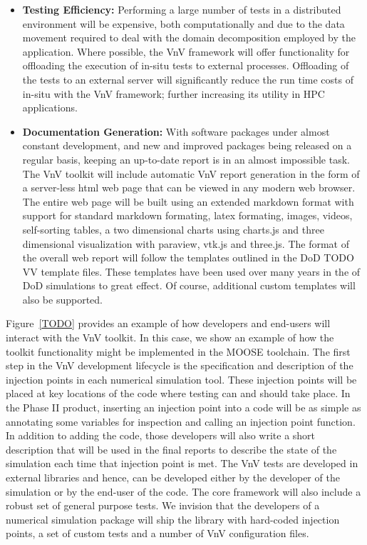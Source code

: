 \begin{itemize}
 \item{\bf \VV Testing Efficiency:}  Performing a large number of \VV tests in a distributed environment will be expensive, both computationally and due to the data movement required to deal with the domain decomposition employed by the application. Where possible, the VnV framework will offer functionality for offloading the execution of in-situ tests to external processes. Offloading of the tests to an external server will significantly reduce the run time costs of in-situ \VV with the VnV framework; further increasing its utility in HPC applications. 
 
 \item{\bf Documentation Generation:} With software packages under almost constant development, and new and improved packages being released on a regular basis, keeping an up-to-date \VV report is in an almost impossible task. The VnV toolkit will include automatic VnV report generation in the form of a server-less html web page that can be viewed in any modern web browser. The entire web page will be built using an extended markdown format with support for standard markdown formating, latex formating, images, videos, self-sorting tables, a two dimensional charts using charts.js  and three dimensional visualization with paraview, vtk.js and three.js. The format of the overall web report will follow the templates outlined in the DoD TODO VV template files. These templates have been used over many years in the \VVA of DoD simulations to great effect. Of course, additional custom templates will also be supported. 
 \end{itemize}

Figure~\ref{TODO} provides an example of how developers and end-users will interact with the VnV toolkit. In this case, we show an example of how the toolkit functionality might be implemented in the MOOSE toolchain. The first step in the VnV development lifecycle is the specification and description of the injection points in each numerical simulation tool. These injection points will be placed at key locations of the code where testing can and should take place. In the Phase II product, inserting an injection point into a code will be as simple as annotating some variables for inspection and calling an injection point function. In addition to adding the code, those developers will also write a short description that will be used in the final \VV reports to describe the state of the simulation each time that injection point is met. The VnV tests are developed in external libraries and hence, can be developed either by the developer of the simulation or by the end-user of the code. The core framework will also include a robust set of general purpose \VV tests. We invision that the developers of a numerical simulation package will ship the library with hard-coded injection points, a set of custom \VV tests and a number of VnV configuration files. 

